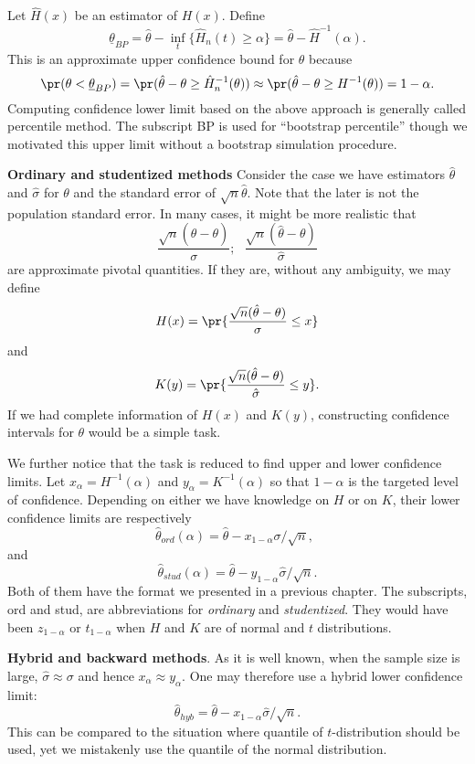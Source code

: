 Let $\hat H(x)$ be an estimator of $H(x)$. 
Define
\[
\underline{\theta}_{BP} 
= 
\hat \theta - \inf_t \{ \hat H_n(t) \geq \alpha\} 
= 
\hat \theta - \hat H^{-1} (\alpha).
\]
This is an approximate upper confidence bound for $\theta$
because
\[
\pr( \theta <  \underline{\theta}_{BP}) 
=
\pr( \hat \theta - \theta \geq \hat H^{-1}_n(\theta)  ) 
\approx
\pr( \hat \theta - \theta \geq H^{-1} (\theta)  ) 
= 1 - \alpha.
\]
Computing confidence lower limit based on the above
approach is generally called percentile method.
The subscript BP is used for ``bootstrap percentile'' though
we motivated this upper limit without a bootstrap
simulation procedure.

\vs
\noindent
{\bf Ordinary and studentized methods}
Consider the case we have estimators
$\hat \theta$ and $\hat \sigma$ for $\theta$ and
the standard error of $\sqrt{n} \hat \theta$. 
Note that the later is not the population standard error.
In many cases, it might be more realistic that
\[
\frac{\sqrt{n} (\hat \theta - \theta)}{\sigma};~~~
\frac{\sqrt{n} (\hat \theta - \theta)}{ \hat \sigma}
\]
are approximate pivotal quantities. 
If they are, without any ambiguity, we may define
\[
H(x) = \pr\{ \frac{\sqrt{n} (\hat \theta - \theta)}{\sigma} \leq x\}
\]
and
\[
K(y) =  \pr\{ \frac{\sqrt{n} (\hat \theta - \theta)}{ \hat \sigma} \leq y\}.
\]
If we had complete information of $H(x)$ and $K(y)$,
constructing confidence intervals for $\theta$ would be a simple task.

We further notice that the task is reduced to find upper
and lower confidence limits.
Let $x_\alpha = H^{-1}(\alpha)$ and $y_\alpha = K^{-1} (\alpha)$
so that $1-\alpha$ is the targeted level of confidence.
Depending on either we have knowledge on $H$ or on $K$,
their  lower confidence limits are respectively
\[
\hat \theta_{ord}(\alpha) 
= 
\hat \theta -  x_{1-\alpha}  \sigma/\sqrt{n}, ~~
\]
and
\[
\hat \theta_{stud}(\alpha) 
= 
\hat \theta - y _{1-\alpha} \hat{\sigma}/\sqrt{n}.
\]
Both of them have the format we presented in a previous chapter. 
The subscripts, ord and stud, are abbreviations for
{\it ordinary} and {\it studentized}. They would have been
$z_{1-\alpha}$ or $t_{1-\alpha}$ when $H$ and $K$ are
\cdf of normal and $t$ distributions.

\vs
\noindent
{\bf Hybrid and backward methods}.
As it is well known, when the sample size is large,
$\hat \sigma \approx \sigma$ and hence $x_\alpha \approx y_\alpha$.
One may therefore use a hybrid lower confidence limit:
\[
\hat \theta_{hyb} 
= \hat \theta - x_{1-\alpha}  \hat{\sigma}/\sqrt{n}.
\]
This can be compared to the situation where quantile of
$t$-distribution should be used, yet we mistakenly use
the quantile of the normal distribution.

